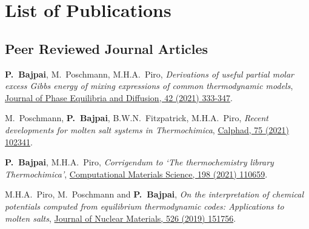 \chapter*{List of Publications}
\label{publications}


\section*{Peer Reviewed Journal Articles}
\vspace*{1em}
\begin{enumerate}{\small \compresslist
\item \textbf{P.\ Bajpai}, {M.\ Poschmann}, {M.H.A.\ Piro}, \textit{Derivations of useful partial molar excess Gibbs energy of mixing expressions of common thermodynamic models}, \href{https://doi.org/10.1007/s11669-021-00886-w}{Journal of Phase Equilibria and Diffusion, 42 (2021) 333-347}.
\item {M.\ Poschmann}, \textbf{P.\ Bajpai}, {B.W.N.\ Fitzpatrick}, {M.H.A.\ Piro}, \textit{Recent developments for molten salt systems in Thermochimica}, \href{https://doi.org/10.1016/j.calphad.2021.102341}{Calphad, 75 (2021) 102341}.
\item \textbf{P.\ Bajpai}, {M.H.A.\ Piro}, \textit{Corrigendum to `The thermochemistry library Thermochimica'}, \href{https://doi.org/10.1016/j.commatsci.2021.110659}{Computational Materials Science, 198 (2021) 110659}.
\item {M.H.A.\ Piro}, {M.\ Poschmann} and \textbf{P.\ Bajpai}, \textit{On the interpretation of chemical potentials computed from equilibrium thermodynamic codes: Applications to molten salts}, \href{https://doi.org/10.1016/j.jnucmat.2019.151756}{Journal of Nuclear Materials, 526 (2019) 151756}.
}\end{enumerate}

